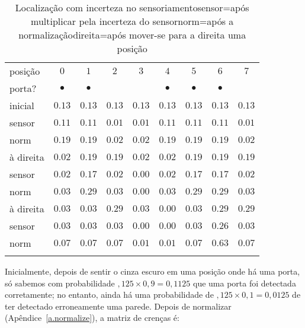\begin{table}
\caption[Localização com incerteza no sensoriamento]{Localização com incerteza no sensoriamento\newline{}sensor=após multiplicar pela incerteza do sensor\newline{}norm=após a normalização\newline{}direita=após mover-se para a direita uma posição}\label{tab.uncertain-sensing}
\setlength{\tabcolsep}{6pt}
\begin{tabular}{l|rrrrrrrr}
\hline\noalign{\smallskip}
posição&\multicolumn{1}{c}{$0$}&\multicolumn{1}{c}{$1$}&\multicolumn{1}{c}{$2$}&\multicolumn{1}{c}{$3$}&\multicolumn{1}{c}{$4$}&\multicolumn{1}{c}{$5$}&\multicolumn{1}{c}{$6$}&\multicolumn{1}{c}{$7$}\\
porta?&\multicolumn{1}{c}{$\bullet$}&\multicolumn{1}{c}{$\bullet$}&&&\multicolumn{1}{c}{$\bullet$}&\multicolumn{1}{c}{$\bullet$}&\multicolumn{1}{c}{$\bullet$}&\\
\hline\noalign{\smallskip}
inicial &$0.13$ & $0.13$ & $0.13$ & $0.13$ & $0.13$ & $0.13$ & $0.13$ & $0.13$\\
sensor  &$0.11$ & $0.11$ & $0.01$ & $0.01$ & $0.11$ & $0.11$ & $0.11$ & $0.01$\\
norm    &$0.19$ & $0.19$ & $0.02$ & $0.02$ & $0.19$ & $0.19$ & $0.19$ & $0.02$\\
\hline
à direita   &$0.02$ & $0.19$ & $0.19$ & $0.02$ & $0.02$ & $0.19$ & $0.19$ & $0.19$\\
sensor  &$0.02$ & $0.17$ & $0.02$ & $0.00$ & $0.02$ & $0.17$ & $0.17$ & $0.02$\\
norm    &$0.03$ & $0.29$ & $0.03$ & $0.00$ & $0.03$ & $0.29$ & $0.29$ & $0.03$\\
\hline
à direita   &$0.03$ & $0.03$ & $0.29$ & $0.03$ & $0.00$ & $0.03$ & $0.29$ & $0.29$\\
sensor  &$0.03$ & $0.03$ & $0.03$ & $0.00$ & $0.00$ & $0.03$ & $0.26$ & $0.03$\\
norm    &$0.07$ & $0.07$ & $0.07$ & $0.01$ & $0.01$ & $0.07$ & $0.63$ & $0.07$\\
\noalign{\smallskip}\hline\noalign{\smallskip}
\end{tabular}
\end{table}

Inicialmente, depois de sentir o cinza escuro em uma posição onde há uma porta, só sabemos com probabilidade $,125\times 0,9 = 0,1125$ que uma porta foi detectada corretamente; no entanto, ainda há uma probabilidade de $,125 \times 0,1= 0,0125$ de ter detectado erroneamente uma parede. Depois de normalizar (Apêndice~\ref{a.normalize}), a matriz de crenças é:
\begin{center}
\end{center}


